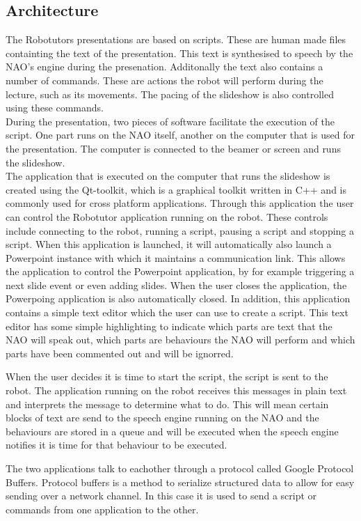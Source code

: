 \subsection{Architecture}
The Robotutors presentations are based on scripts. These are human made files containting the text of the presentation. This text is synthesised to speech by the NAO's engine during the presenation. Additonally the text also contains a number of commands. These are actions the robot will perform during the lecture, such as its movements. The pacing of the slideshow is also controlled using these commands.\\
During the presentation, two pieces of software facilitate the execution of the script. One part runs on the NAO itself, another on the computer that is used for the presentation. The computer is connected to the beamer or screen and runs the slideshow.\\

The application that is executed on the computer that runs the slideshow is created using the Qt-toolkit, which is a graphical toolkit written in C++ and is commonly used for cross platform applications. Through this application the user can control the Robotutor application running on the robot. These controls include connecting to the robot, running a script, pausing a script and stopping a script. When this application is launched, it will automatically also launch a Powerpoint instance with which it maintains a communication link. This allows the application to control the Powerpoint application, by for example triggering a next slide event or even adding slides. When the user closes the application, the Powerpoing application is also automatically closed. In addition, this application contains a simple text editor which the user can use to create a script. This text editor has some simple highlighting to indicate which parts are text that the NAO will speak out, which parts are behaviours the NAO will perform and which parts have been commented out and will be ignorred.

When the user decides it is time to start the script, the script is sent to the robot. The application running on the robot receives this messages in plain text and interprets the message to determine what to do. This will mean certain blocks of text are send to the speech engine running on the NAO and the behaviours are stored in a queue and will be executed when the speech engine notifies it is time for that behaviour to be executed.

The two applications talk to eachother through a protocol called Google Protocol Buffers. Protocol buffers is a method to serialize structured data to allow for easy sending over a network channel. In this case it is used to send a script or commands from one application to the other.

